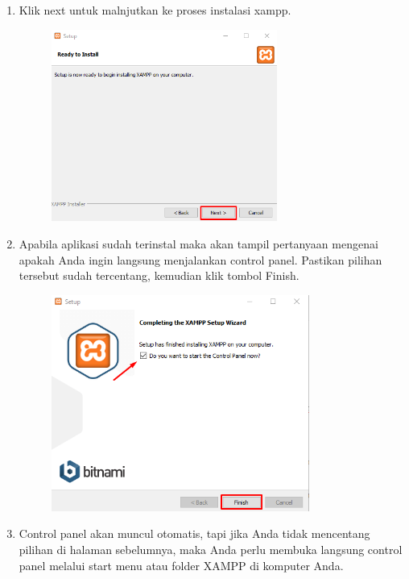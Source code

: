 \begin{enumerate}
	\item Klik next untuk malnjutkan ke proses instalasi xampp.
		\begin{figure}[!htbp]
    		\centering
    		\includegraphics[width=0.7\textwidth]{figures/XAMPP/Xampp7.png}
    		\label{Xampp7}
		\end{figure}
		
	\item Apabila aplikasi sudah terinstal maka akan tampil pertanyaan mengenai apakah Anda ingin langsung menjalankan control panel. Pastikan pilihan tersebut sudah tercentang, kemudian klik tombol Finish.
		\begin{figure}[!htbp]
    		\centering
    		\includegraphics[width=0.8\textwidth]{figures/XAMPP/Xampp8.png}
    		\label{Xampp8}
		\end{figure}
		
	\item Control panel akan muncul otomatis, tapi jika Anda tidak mencentang pilihan di halaman sebelumnya, maka Anda perlu membuka langsung control panel melalui start menu atau folder XAMPP di komputer Anda.
	

\end{enumerate}
